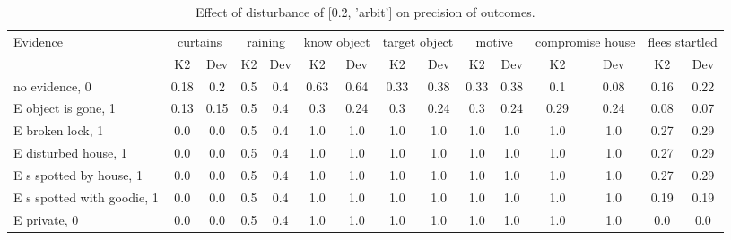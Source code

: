 \begin{table}\begin{tabular}{l|cc|cc|cc|cc|cc|cc|cc}\toprule\multirow{2}{*}{Evidence} & \multicolumn{2}{c}{curtains}& \multicolumn{2}{c}{raining}& \multicolumn{2}{c}{know object}& \multicolumn{2}{c}{target object}& \multicolumn{2}{c}{motive}& \multicolumn{2}{c}{compromise house}& \multicolumn{2}{c}{flees startled}\\& {K2} & {Dev}& {K2} & {Dev}& {K2} & {Dev}& {K2} & {Dev}& {K2} & {Dev}& {K2} & {Dev}& {K2} & {Dev}\\\midrule
no evidence, 0 & 0.18&0.2&\cellcolor{Bittersweet}0.5&\cellcolor{Bittersweet}0.4&0.63&0.64&0.33&0.38&0.33&0.38&0.1&0.08&\cellcolor{Bittersweet}0.16&\cellcolor{Bittersweet}0.22\\E object is gone, 1 & 0.13&0.15&\cellcolor{Bittersweet}0.5&\cellcolor{Bittersweet}0.4&\cellcolor{Bittersweet}0.3&\cellcolor{Bittersweet}0.24&\cellcolor{Bittersweet}0.3&\cellcolor{Bittersweet}0.24&\cellcolor{Bittersweet}0.3&\cellcolor{Bittersweet}0.24&0.29&0.24&0.08&0.07\\E broken lock, 1 & 0.0&0.0&\cellcolor{Bittersweet}0.5&\cellcolor{Bittersweet}0.4&1.0&1.0&1.0&1.0&1.0&1.0&1.0&1.0&0.27&0.29\\E disturbed house, 1 & 0.0&0.0&\cellcolor{Bittersweet}0.5&\cellcolor{Bittersweet}0.4&1.0&1.0&1.0&1.0&1.0&1.0&1.0&1.0&0.27&0.29\\E s spotted by house, 1 & 0.0&0.0&\cellcolor{Bittersweet}0.5&\cellcolor{Bittersweet}0.4&1.0&1.0&1.0&1.0&1.0&1.0&1.0&1.0&0.27&0.29\\E s spotted with goodie, 1 & 0.0&0.0&\cellcolor{Bittersweet}0.5&\cellcolor{Bittersweet}0.4&1.0&1.0&1.0&1.0&1.0&1.0&1.0&1.0&0.19&0.19\\E private, 0 & 0.0&0.0&\cellcolor{Bittersweet}0.5&\cellcolor{Bittersweet}0.4&1.0&1.0&1.0&1.0&1.0&1.0&1.0&1.0&0.0&0.0\\\bottomrule\end{tabular}\caption{Effect of disturbance of [0.2, 'arbit'] on precision of outcomes.}\end{table}